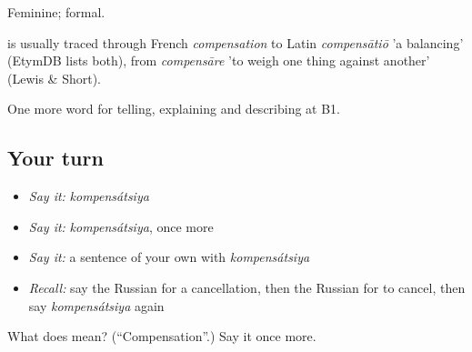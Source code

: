 Feminine; formal.

\begin{cousinweb}
\emph{} is usually traced through French \emph{compensation} to Latin \emph{compensātiō} 'a balancing' (EtymDB lists both), from \emph{compensāre} 'to weigh one thing against another' (Lewis \& Short).
\end{cousinweb}

\begin{grammarlens}[title={What you've built}]
One more word for telling, explaining and describing at B1.
\end{grammarlens}

\subsection*{Your turn}
\begin{itemize}
\raggedright
  \item \emph{Say it:} \emph{kompensátsiya}
  \item \emph{Say it:} \emph{kompensátsiya}, once more
  \item \emph{Say it:} a sentence of your own with \emph{kompensátsiya}
  \item \emph{Recall:} say the Russian for a cancellation, then the Russian for to cancel, then say \emph{kompensátsiya} again
\end{itemize}

\begin{tcolorbox}[breakable,colback=teal!4,colframe=teal!35!black,title={Before you move on}]
What does  mean? (\textquotedblleft{}Compensation\textquotedblright{}.) Say it once more.
\end{tcolorbox}
